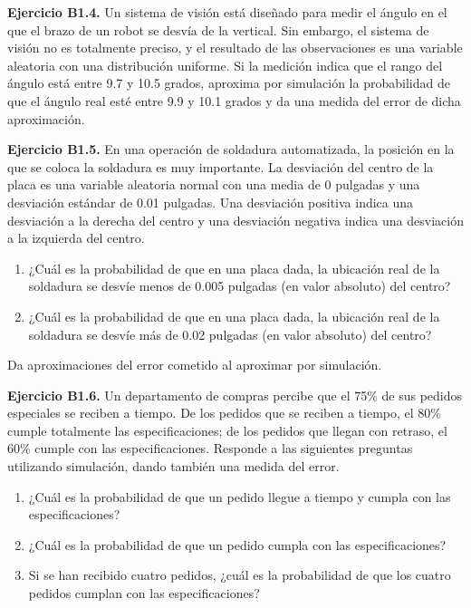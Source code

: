 \documentclass[
]{book}
\providecommand{\tightlist}{%
  \setlength{\itemsep}{0pt}\setlength{\parskip}{0pt}}
\theoremstyle{definition}
\theoremstyle{definition}
\theoremstyle{definition}
\theoremstyle{definition}
\theoremstyle{remark}
\begin{document}
\textbf{Ejercicio B1.4.} Un sistema de visión está diseñado para medir el ángulo en el que el brazo de un robot se desvía de la vertical. Sin embargo, el sistema de visión no es totalmente preciso, y el resultado de las observaciones es una variable aleatoria con una distribución uniforme. Si la medición indica que el rango del ángulo está entre 9.7 y 10.5 grados, aproxima por simulación la probabilidad de que el ángulo real esté entre 9.9 y 10.1 grados y da una medida del error de dicha aproximación.

\textbf{Ejercicio B1.5.} En una operación de soldadura automatizada, la posición en la que se coloca la soldadura es muy importante. La desviación del centro de la placa es una variable aleatoria normal con una media de 0 pulgadas y una desviación estándar de 0.01 pulgadas. Una desviación positiva indica una desviación a la derecha del centro y una desviación negativa indica una desviación a la izquierda del centro.

\begin{enumerate}
\def\labelenumi{\arabic{enumi}.}
\tightlist
\item
  ¿Cuál es la probabilidad de que en una placa dada, la ubicación real de la soldadura se desvíe menos de 0.005 pulgadas (en valor absoluto) del centro?
\item
  ¿Cuál es la probabilidad de que en una placa dada, la ubicación real de la soldadura se desvíe más de 0.02 pulgadas (en valor absoluto) del centro?
\end{enumerate}

Da aproximaciones del error cometido al aproximar por simulación.

\textbf{Ejercicio B1.6.} Un departamento de compras percibe que el 75\% de sus pedidos especiales se reciben a tiempo. De los pedidos que se reciben a tiempo, el 80\% cumple totalmente las especificaciones; de los pedidos que llegan con retraso, el 60\% cumple con las especificaciones. Responde a las siguientes preguntas utilizando simulación, dando también una medida del error.

\begin{enumerate}
\def\labelenumi{\arabic{enumi}.}
\tightlist
\item
  ¿Cuál es la probabilidad de que un pedido llegue a tiempo y cumpla con las especificaciones?
\item
  ¿Cuál es la probabilidad de que un pedido cumpla con las especificaciones?
\item
  Si se han recibido cuatro pedidos, ¿cuál es la probabilidad de que los cuatro pedidos cumplan con las especificaciones?
\end{enumerate}
\end{document}
